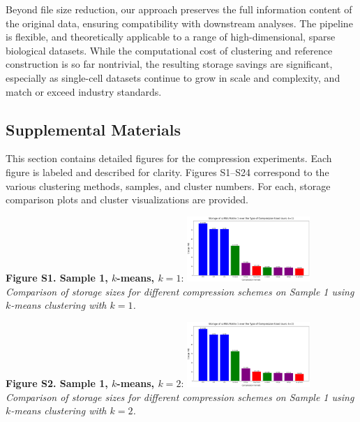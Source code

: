 \documentclass[unnumsec,webpdf,contemporary,large]{oup-authoring-template}
\begin{document}
Beyond file size reduction, our approach preserves the full information content of the original data, ensuring compatibility with downstream analyses. The pipeline is flexible, and theoretically applicable to a range of high-dimensional, sparse biological datasets. While the computational cost of clustering and reference construction is so far nontrivial, the resulting storage savings are significant, especially as single-cell datasets continue to grow in scale and complexity, and match or exceed industry standards.




\subsection{Supplemental Materials}

This section contains detailed figures for the compression experiments. Each figure is labeled and described for clarity. Figures S1--S24 correspond to the various clustering methods, samples, and cluster numbers. For each, storage comparison plots and cluster visualizations are provided. 


\textbf{Figure S1. Sample 1, $k$-means, $k=1$}:
\newline
\includegraphics[width=0.35\textwidth]{compressed/kmeans/sample1/k1/storage_comparisons.png}\\
\textit{Comparison of storage sizes for different compression schemes on Sample 1 using $k$-means clustering with $k=1$.}

\textbf{Figure S2. Sample 1, $k$-means, $k=2$}:
\newline
\includegraphics[width=0.35\textwidth]{compressed/kmeans/sample1/k2/storage_comparisons.png}\\
\textit{Comparison of storage sizes for different compression schemes on Sample 1 using $k$-means clustering with $k=2$.}
\end{document}
